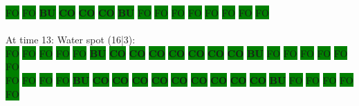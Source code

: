 \colorbox{green}{\color[gray]{0.75}FO}%
\colorbox{green}{\color[gray]{0.75}FO}%
\colorbox{green}{\color[rgb]{1,0,0}\textbf{BU}}%
\colorbox{green}{\color[rgb]{0,0,0}\textbf{CO}}%
\colorbox{green}{\color[rgb]{0,0,0}\textbf{CO}}%
\colorbox{green}{\color[rgb]{0,0,0}\textbf{CO}}%
\colorbox{green}{\color[rgb]{1,0,0}\textbf{BU}}%
\colorbox{green}{\color[gray]{0.75}FO}%
\colorbox{green}{\color[gray]{0.75}FO}%
\colorbox{green}{\color[gray]{0.75}FO}%
\colorbox{green}{\color[gray]{0.75}FO}%
\colorbox{green}{\color[gray]{0.75}FO}%
\colorbox{green}{\color[gray]{0.75}FO}%
\colorbox{green}{\color[gray]{0.75}FO}%
\colorbox{green}{\color[gray]{0.75}FO}%
\\
\\
At time 13: Water spot (16|3):
\\
\colorbox{green}{\color[gray]{0.75}FO}%
\colorbox{green}{\color[gray]{0.75}FO}%
\colorbox{green}{\color[gray]{0.75}FO}%
\colorbox{green}{\color[gray]{0.75}FO}%
\colorbox{green}{\color[gray]{0.75}FO}%
\colorbox{green}{\color[rgb]{1,0,0}\textbf{BU}}%
\colorbox{green}{\color[rgb]{0,0,0}\textbf{CO}}%
\colorbox{green}{\color[rgb]{0,0,0}\textbf{CO}}%
\colorbox{green}{\color[rgb]{0,0,0}\textbf{CO}}%
\colorbox{green}{\color[rgb]{0,0,0}\textbf{CO}}%
\colorbox{green}{\color[rgb]{0,0,0}\textbf{CO}}%
\colorbox{green}{\color[rgb]{0,0,0}\textbf{CO}}%
\colorbox{green}{\color[rgb]{0,0,0}\textbf{CO}}%
\colorbox{green}{\color[rgb]{1,0,0}\textbf{BU}}%
\colorbox{green}{\color[gray]{0.75}FO}%
\colorbox{green}{\color[gray]{0.75}FO}%
\colorbox{green}{\color[gray]{0.75}FO}%
\colorbox{green}{\color[gray]{0.75}FO}%
\colorbox{green}{\color[gray]{0.75}FO}%
\colorbox{green}{\color[gray]{0.75}FO}%
\\
\colorbox{green}{\color[gray]{0.75}FO}%
\colorbox{green}{\color[gray]{0.75}FO}%
\colorbox{green}{\color[gray]{0.75}FO}%
\colorbox{green}{\color[gray]{0.75}FO}%
\colorbox{green}{\color[rgb]{1,0,0}\textbf{BU}}%
\colorbox{green}{\color[rgb]{0,0,0}\textbf{CO}}%
\colorbox{green}{\color[rgb]{0,0,0}\textbf{CO}}%
\colorbox{green}{\color[rgb]{0,0,0}\textbf{CO}}%
\colorbox{green}{\color[rgb]{0,0,0}\textbf{CO}}%
\colorbox{green}{\color[rgb]{0,0,0}\textbf{CO}}%
\colorbox{green}{\color[rgb]{0,0,0}\textbf{CO}}%
\colorbox{green}{\color[rgb]{0,0,0}\textbf{CO}}%
\colorbox{green}{\color[rgb]{0,0,0}\textbf{CO}}%
\colorbox{green}{\color[rgb]{0,0,0}\textbf{CO}}%
\colorbox{green}{\color[rgb]{1,0,0}\textbf{BU}}%
\colorbox{green}{\color[gray]{0.75}FO}%
\colorbox{green}{\color[gray]{0.75}FO}%
\colorbox{green}{\color[gray]{0.75}FO}%
\colorbox{green}{\color[gray]{0.75}FO}%
\colorbox{green}{\color[gray]{0.75}FO}%
